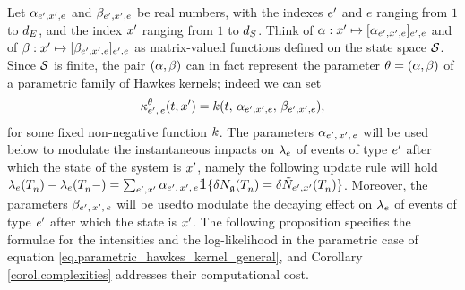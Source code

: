 \documentclass[10pt, article,table]{article}
\begin{document}
Let $\impCoef_{\eone,\xone, e}$ and $\decCoef_{\eone,\xone, e}$ be real numbers, with the indexes $\eone$ and $e$ ranging from $1$ to $\numEventTypes$, and the index $\xone$ ranging from $1$ to $\numStates$. Think of $\impCoef: \xone \mapsto [\impCoef_{\eone,\xone,e}]_{\eone,e}$ and of $\decCoef: \xone \mapsto [\decCoef_{\eone,\xone,e}]_{\eone,e}$ as matrix-valued functions defined on the state space $\stateSpace$. Since $\stateSpace$ is finite, the pair $(\impCoef,\decCoef)$ can in fact represent the parameter $\theta = (\impCoef,\decCoef)$ of a parametric family of Hawkes kernels; indeed we can set
\begin{equation}\label{eq.parametric_hawkes_kernel_general}
 \hawkesKernel^{\theta}\subscriptee(t,\xone)
 = \parametricHawkesKernel(t,\, \impCoef_{\eone,\xone,e},\, \decCoef_{\eone,\xone,e}),
\end{equation}
for some fixed non-negative function $\parametricHawkesKernel$. The parameters $\impCoef\subscriptexe$ will be used below to modulate the instantaneous impacts on $\intensity[e]$ of events of type $\eone$ after which the state of the system is $\xone$, namely the following update rule will hold $\intensity[e](\arrivalTimes[]_n) - \intensity[e](\arrivalTimes[]_n - ) = \sum_{\eone, \xone} \impCoef\subscriptexe \one \lbrace \delta\groundProc(\arrivalTimes[]_n) = \delta\hybridHawkes_{\eone,\xone}(\arrivalTimes[]_n)\rbrace$. Moreover, the parameters $\decCoef\subscriptexe$ will be usedto modulate the decaying effect on $\intensity[e]$ of events of type $\eone$ after which the state is $\xone$.
The  following proposition specifies the formulae for the intensities and the log-likelihood in the parametric case of equation \eqref{eq.parametric_hawkes_kernel_general}, and Corollary \ref{corol.complexities} addresses their computational cost. 
\end{document}
